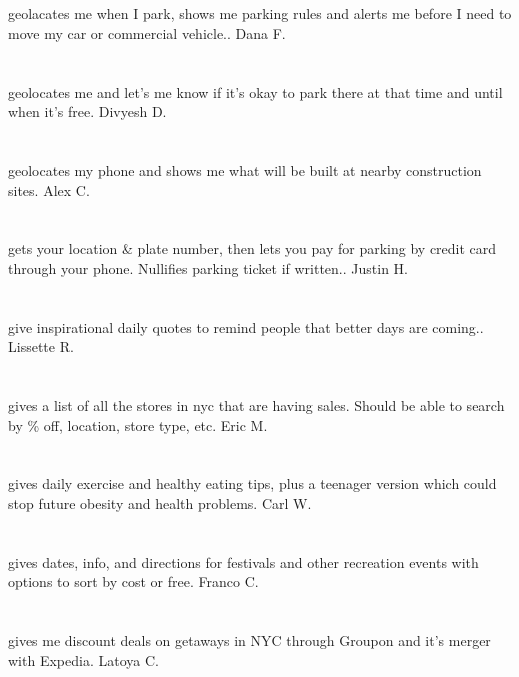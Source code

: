 \section{}geolacates me when I park,  shows me parking rules and alerts me before I need to move my car or commercial vehicle.. Dana F.
\section{}geolocates me and let's me know if it's okay to park there at that time and until when it's free. Divyesh D.
\section{}geolocates my phone and shows me what will be built at nearby construction sites. Alex C.
\section{}gets your location \& plate number,  then lets you pay for parking by credit card through your phone. Nullifies parking ticket if written.. Justin H.
\section{}give inspirational daily quotes to remind people that better days are coming.. Lissette R.
\section{} gives a list of all the stores in nyc that are having sales.  Should be able to search by \% off,  location,  store type,  etc. Eric M.
\section{}gives daily exercise and healthy eating tips,  plus a teenager version which could stop future obesity and health problems. Carl W.
\section{}gives dates,  info,  and directions for festivals and other recreation events with options to sort by cost or free. Franco C.
\section{}gives me discount deals on getaways  in NYC through Groupon and it's merger with Expedia. Latoya C.
